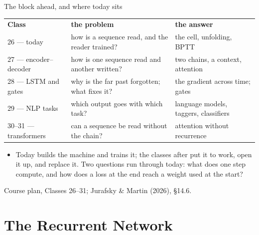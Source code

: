 \documentclass[aspectratio=169, 11pt]{beamer}
\newcommand{\srcline}[1]{%
  \par\vspace{0.25em}%
  {\scriptsize\color{mcMuted}\hfill #1\par}}
\newcommand{\nosrc}{}       %
\begin{document}
\begin{frame}{The block ahead, and where today sits}
  \nosrc
  \vspace{0.1em}
  {\scriptsize
  \renewcommand{\arraystretch}{1.3}
  \begin{tabular}{@{}l@{\hspace{0.8em}}l@{\hspace{0.8em}}l@{}}
    \textbf{Class} & \textbf{the problem} & \textbf{the answer}\\
    \alert{26 --- today} & how is a sequence read, and the reader trained? & the cell, unfolding, BPTT\\
    27 --- encoder--decoder & how is one sequence read and another written? & two chains, a context, attention\\
    28 --- LSTM and gates & why is the far past forgotten; what fixes it? & the gradient across time; gates\\
    29 --- NLP tasks & which output goes with which task? & language models, taggers, classifiers\\
    30--31 --- transformers & can a sequence be read without the chain? & attention without recurrence\\
  \end{tabular}}
  \vspace{0.4em}

  {\footnotesize
  \begin{itemize}\itemsep0.2em
    \item Today builds the machine and trains it; the classes after put
          it to work, open it up, and replace it. Two questions run through
          today: what does one step compute, and how does a loss at the end
          reach a weight used at the start?
  \end{itemize}}
  \srcline{Course plan, Classes 26--31; Jurafsky \& Martin (2026), \S14.6.}
\end{frame}

\section{The Recurrent Network}
\end{document}
